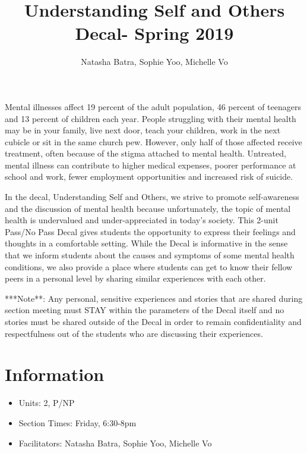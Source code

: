 \documentclass[fleqn,10pt]{wlscirep}
\begin{document}
\title{Understanding Self and Others Decal- Spring 2019}

\author{Natasha Batra, Sophie Yoo, Michelle Vo}

\thispagestyle{empty}
\maketitle
Mental illnesses affect 19 percent of the adult population, 46 percent of teenagers and 13 percent of children each year. People struggling with their mental health may be in your family, live next door, teach your children, work in the next cubicle or sit in the same church pew. However, only half of those affected receive treatment, often because of the stigma attached to mental health. Untreated, mental illness can contribute to higher medical expenses, poorer performance at school and work, fewer employment opportunities and increased risk of suicide.

In the decal, Understanding Self and Others, we strive to promote self-awareness and the discussion of mental health because unfortunately, the topic of mental health is undervalued and under-appreciated in today’s society. This 2-unit Pass/No Pass Decal gives students the opportunity to express their feelings and thoughts in a comfortable setting. While the Decal is informative in the sense that we inform students about the causes and symptoms of some mental health conditions, we also provide a place where students can get to know their fellow peers in a personal level by sharing similar experiences with each other. 

    \sectionmark  
    ***Note**: Any personal, sensitive experiences and stories that are shared during section meeting must STAY within the parameters of the Decal itself and no stories must be shared outside of the Decal in order to remain confidentiality and respectfulness out of the students who are discussing their experiences.
\section*{Information}

\begin{itemize}
    \item Units: 2, P/NP
    \item Section Times: Friday, 6:30-8pm 
    \item Facilitators: Natasha Batra, Sophie Yoo, Michelle Vo
\end{itemize}
\end{document}
